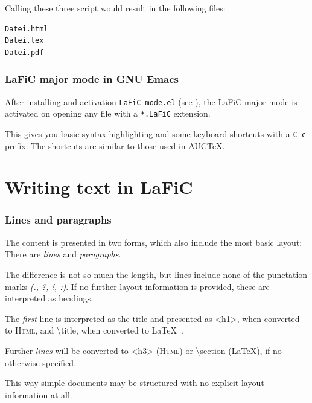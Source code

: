 \documentclass{article}
\begin{document}
{Calling these three script would result in the following
files:\\}

\begin{verbatim}
Datei.html
Datei.tex
Datei.pdf
\end{verbatim}


\section{LaFiC major mode in GNU Emacs}

{After installing and activation \texttt{LaFiC-mode.el} (see
\xspace ), the LaFiC major mode is activated on opening
any file with a \texttt{*.LaFiC} extension.\\}

{This gives you basic syntax highlighting and some keyboard
shortcuts with a \texttt{C-c} prefix. The shortcuts are similar to
those used in AUCTeX.\\}

\part{Writing text in LaFiC}
\label{Writing}

\section{Lines and paragraphs}

{The content is presented in two forms, which also include
the most basic layout: There are \emph{lines} and \emph{paragraphs}.\\}

{The difference is not so much the length, but lines include
none of the punctation marks \emph{(., ?, !, :)}. If no
further layout information is provided, these are
interpreted as headings.\\}

{The \emph{first} line is interpreted as the title and presented as
 <h1>, when converted to \textsc{Html}, and \textbackslash title, when 
converted to \LaTeX\ .\\}

{Further \emph{lines} will be converted to <h3> (\textsc{Html}) or \textbackslash section
(LaTeX), if no otherwise specified.\\}

{This way simple documents may be structured with no explicit
layout information at all.\\}
\end{document}
